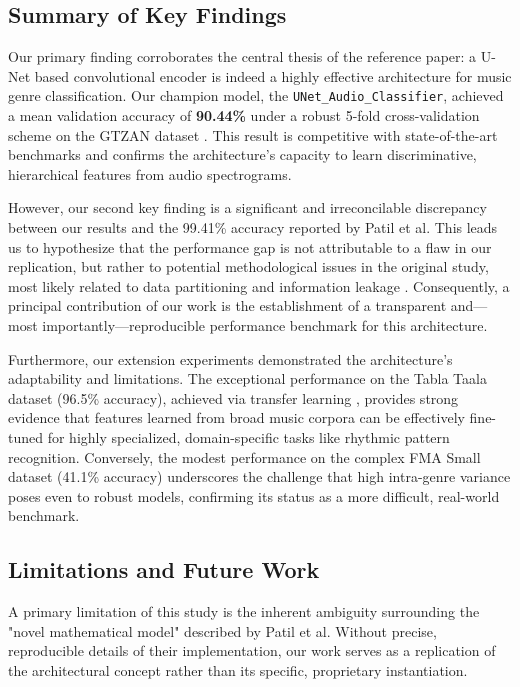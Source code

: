 \documentclass[11pt,a4paper]{article}
\begin{document}
\subsection{Summary of Key Findings}
Our primary finding corroborates the central thesis of the reference paper: a U-Net based convolutional encoder is indeed a highly effective architecture for music genre classification. Our champion model, the \texttt{UNet\_Audio\_Classifier}, achieved a mean validation accuracy of \textbf{90.44\%} under a robust 5-fold cross-validation scheme on the GTZAN dataset \textbf{\cite{tzanetakis2002gtzan}}. This result is competitive with state-of-the-art benchmarks and confirms the architecture's capacity to learn discriminative, hierarchical features from audio spectrograms.

However, our second key finding is a significant and irreconcilable discrepancy between our results and the 99.41\% accuracy reported by Patil et al. This leads us to hypothesize that the performance gap is not attributable to a flaw in our replication, but rather to potential methodological issues in the original study, most likely related to data partitioning and information leakage \textbf{\cite{salamon2017data_leakage}}. %
Consequently, a principal contribution of our work is the establishment of a transparent and—most importantly—reproducible performance benchmark for this architecture.

Furthermore, our extension experiments demonstrated the architecture's adaptability and limitations. The exceptional performance on the Tabla Taala dataset (96.5\% accuracy), achieved via transfer learning \textbf{\cite{choi2017transfer}}, %
provides strong evidence that features learned from broad music corpora can be effectively fine-tuned for highly specialized, domain-specific tasks like rhythmic pattern recognition. Conversely, the modest performance on the complex FMA Small dataset (41.1\% accuracy) \textbf{\cite{defferrard2017fma}} %
underscores the challenge that high intra-genre variance poses even to robust models, confirming its status as a more difficult, real-world benchmark.

\subsection{Limitations and Future Work}
A primary limitation of this study is the inherent ambiguity surrounding the "novel mathematical model" described by Patil et al. Without precise, reproducible details of their implementation, our work serves as a replication of the architectural concept rather than its specific, proprietary instantiation.
\end{document}
